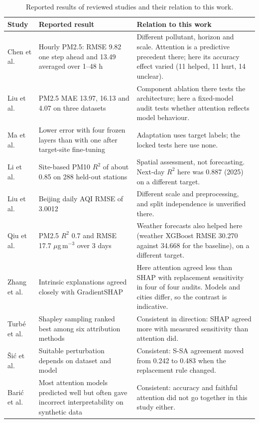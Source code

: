 \documentclass[pdflatex,sn-mathphys-num]{sn-jnl}
\begin{document}
\begin{table}[!htbp]
\centering
\footnotesize
\caption{Reported results of reviewed studies and their relation to this work.}\label{tab:compare}
\begin{tabular}{p{}p{}p{}}
\toprule
\textbf{Study} & \textbf{Reported result} & \textbf{Relation to this work} \\
\midrule
Chen et al.~\cite{chen23} & Hourly PM2.5: RMSE 9.82 one step ahead and 13.49 averaged over 1--48 h & Different pollutant, horizon and scale. Attention is a predictive precedent there; here its accuracy effect varied (11 helped, 11 hurt, 14 unclear). \\
Liu et al.~\cite{liu23} & PM2.5 MAE 13.97, 16.13 and 4.07 on three datasets & Component ablation there tests the architecture; here a fixed-model audit tests whether attention reflects model behaviour. \\
Ma et al.~\cite{ma} & Lower error with four frozen layers than with one after target-site fine-tuning & Adaptation uses target labels; the locked tests here use none. \\
Li et al.~\cite{li} & Site-based PM10 $R^2$ of about 0.85 on 288 held-out stations & Spatial assessment, not forecasting. Next-day $R^2$ here was 0.887 (2025) on a different target. \\
Liu et al.~\cite{liu25} & Beijing daily AQI RMSE of 3.0012 & Different scale and preprocessing, and split independence is unverified there. \\
Qiu et al.~\cite{ppn} & PM2.5 $R^2$ 0.7 and RMSE 17.7 $\mu$g\,m$^{-3}$ over 3 days & Weather forecasts also helped here (weather XGBoost RMSE 30.270 against 34.668 for the baseline), on a different target. \\
Zhang et al.~\cite{zhang} & Intrinsic explanations agreed closely with GradientSHAP & Here attention agreed less than SHAP with replacement sensitivity in four of four audits. Models and cities differ, so the contrast is indicative. \\
Turb\'e et al.~\cite{turbe} & Shapley sampling ranked best among six attribution methods & Consistent in direction: SHAP agreed more with measured sensitivity than attention did. \\
\v{S}i\'c et al.~\cite{simic} & Suitable perturbation depends on dataset and model & Consistent: S-SA agreement moved from 0.242 to 0.483 when the replacement rule changed. \\
Bari\'c et al.~\cite{entropy} & Most attention models predicted well but often gave incorrect interpretability on synthetic data & Consistent: accuracy and faithful attention did not go together in this study either. \\
\bottomrule
\end{tabular}
\end{table}
\end{document}
